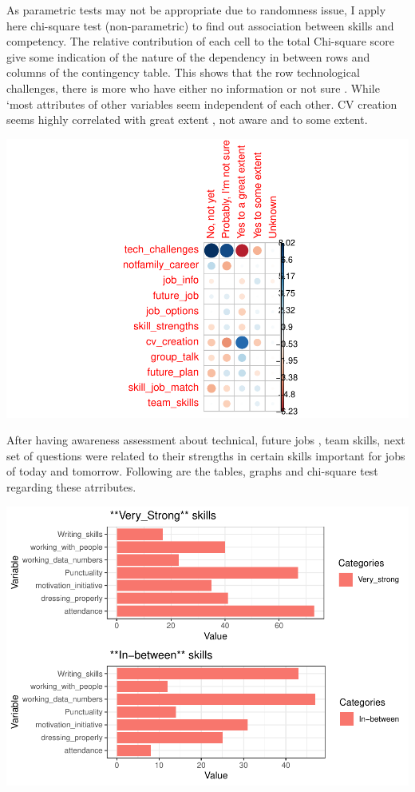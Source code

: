 \documentclass[
]{aft}
\begin{document}
As parametric tests may not be appropriate due to randomness issue, I
apply here chi-square test (non-parametric) to find out association
between skills and competency. The relative contribution of each cell to
the total Chi-square score give some indication of the nature of the
dependency in between rows and columns of the contingency table. This
shows that the row technological challenges, there is more who have
either no information or not sure . While `most attributes of other
variables seem independent of each other. CV creation seems highly
correlated with great extent , not aware and to some extent.

\includegraphics{journal_article_files/figure-pdf/unnamed-chunk-9-1.pdf}

After having awareness assessment about technical, future jobs , team
skills, next set of questions were related to their strengths in certain
skills important for jobs of today and tomorrow. Following are the
tables, graphs and chi-square test regarding these atrributes.

\includegraphics{journal_article_files/figure-pdf/unnamed-chunk-11-1.pdf}
\end{document}
